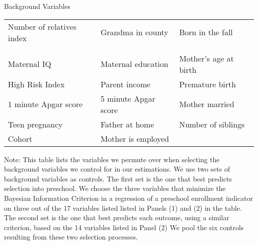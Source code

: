 \begin{threeparttable}
\caption{Background Variables}
\label{tab:pselectvars}
\begin{tabular}{C{5cm} C{5cm} C{5cm}}
\toprule
{} \\
\midrule
Number of relatives index	& Grandma in county	& Born in the fall \\\\
\midrule
{} \\
\midrule
Maternal IQ			& Maternal education		& Mother's age at birth \\
High Risk Index		& Parent income			& Premature birth \\
1 minute Apgar score	& 5 minute Apgar score	& Mother married \\
Teen pregnancy		& Father at home			& Number of siblings \\
Cohort 				& Mother is employed		& \\
\bottomrule
\end{tabular}
\begin{tablenotes}
\footnotesize
\item Note: This table lists the variables we permute over when selecting the background variables we control for in our estimations. We use two sets of background variables as controls. The first set is the one that best predicts selection into preschool. We choose the three variables that minimize the Bayesian Information Criterion in a regression of a preschool enrollment indicator on three out of the 17 variables listed listed in Panels (1) and (2) in the table. The second set is the one that best predicts each outcome, using a similar criterion, based on the 14 variables listed in Panel (2) We pool the six controls resulting from these two selection processes.
\end{tablenotes}
\end{threeparttable}